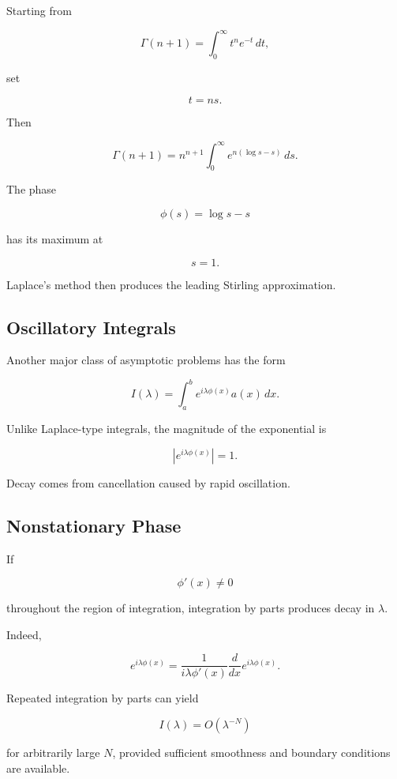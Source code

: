 Starting from

\[
\Gamma(n+1)
=
\int_0^\infty
t^ne^{-t}\,dt,
\]

set

\[
t=ns.
\]

Then

\[
\Gamma(n+1)
=
n^{n+1}
\int_0^\infty
e^{n(\log s-s)}\,ds.
\]

The phase

\[
\phi(s)=\log s-s
\]

has its maximum at

\[
s=1.
\]

Laplace's method then produces the leading Stirling approximation.

\subsection{Oscillatory Integrals}
\label{subsec:asymptotic-oscillatory-integrals}

Another major class of asymptotic problems has the form

\[
\boxed{
I(\lambda)
=
\int_a^b
e^{i\lambda\phi(x)}
a(x)\,dx.
}
\]

Unlike Laplace-type integrals, the magnitude of the exponential is

\[
|e^{i\lambda\phi(x)}|=1.
\]

Decay comes from cancellation caused by rapid oscillation.

\subsection{Nonstationary Phase}
\label{subsec:nonstationary-phase}

If

\[
\phi'(x)\neq0
\]

throughout the region of integration, integration by parts produces
decay in \(\lambda\).

Indeed,

\[
e^{i\lambda\phi(x)}
=
\frac{1}{i\lambda\phi'(x)}
\frac{d}{dx}
e^{i\lambda\phi(x)}.
\]

Repeated integration by parts can yield

\[
\boxed{
I(\lambda)=O(\lambda^{-N})
}
\]

for arbitrarily large \(N\), provided sufficient smoothness and boundary
conditions are available.

